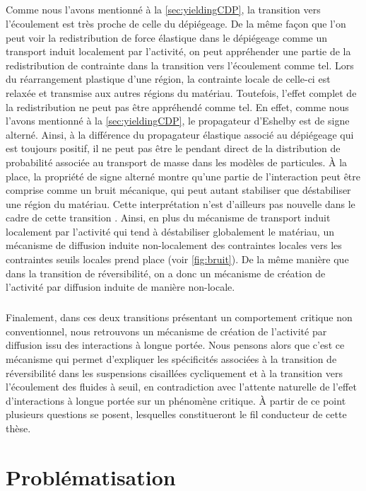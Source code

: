 \subparagraph{}Comme nous l'avons mentionné à la \autoref{sec:yieldingCDP}, la transition vers l'écoulement est très proche de celle du dépiégeage. De la même façon que l'on peut voir la redistribution de force élastique dans le dépiégeage comme un transport induit localement par l'activité, on peut appréhender une partie de la redistribution de contrainte dans la transition vers l'écoulement comme tel. Lors du réarrangement plastique d'une région, la contrainte locale de celle-ci est relaxée et transmise aux autres régions du matériau. Toutefois, l'effet complet de la redistribution ne peut pas être appréhendé comme tel. En effet, comme nous l'avons mentionné à la \autoref{sec:yieldingCDP}, le propagateur d'Eshelby est de signe alterné. Ainsi, à la différence du propagateur élastique associé au dépiégeage qui est toujours positif, il ne peut pas être le pendant direct de la distribution de probabilité associée au transport de masse dans les modèles de particules. \`A la place, la propriété de signe alterné montre qu'une partie de l'interaction peut être comprise comme un bruit mécanique, qui peut autant stabiliser que déstabiliser une région du matériau. Cette interprétation n'est d'ailleurs pas nouvelle dans le cadre de cette transition \cite{lin_mean-field_2016, ferrero_criticality_2019}. Ainsi, en plus du mécanisme de transport induit localement par l'activité qui tend à déstabiliser globalement le matériau, un mécanisme de diffusion induite non-localement des contraintes locales vers les contraintes seuils locales prend place (voir \autoref{fig:bruit}). De la même manière que dans la transition de réversibilité, on a donc un mécanisme de création de l'activité par diffusion induite de manière non-locale.

\subparagraph{}Finalement, dans ces deux transitions présentant un comportement critique non conventionnel, nous retrouvons un mécanisme de création de l'activité par diffusion issu des interactions à longue portée. Nous pensons alors que c'est ce mécanisme qui permet d'expliquer les spécificités associées à la transition de réversibilité dans les suspensions cisaillées cycliquement et à la transition vers l'écoulement des fluides à seuil, en contradiction avec l'attente naturelle de l'effet d'interactions à longue portée sur un phénomène critique. \`A partir de ce point plusieurs questions se posent, lesquelles constitueront le fil conducteur de cette thèse.

\section{Problématisation}

